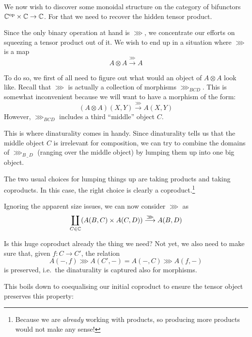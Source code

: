 We now wish to discover some monoidal structure on the category of bifunctors
\\${\mathbb{C}}^{\text{op}} \times \mathbb{C} \to \mathbb{C}$. For that we need to recover the hidden
tensor product.

Since the only binary operation at hand is $\ggg$, we concentrate our efforts
on squeezing a tensor product out of it. We wish to end up in a situation where
$\ggg$ is a map \[ A \otimes A \overset{\ggg}{\longrightarrow} A \]

To do so, we first of all need to figure out what would an object of $A \otimes
A$ look like. Recall that $\ggg$ is actually a collection of morphisms
$\ggg_{BCD}$. This is somewhat inconvenient because we will want to have a
morphism of the form: \[ (A \otimes A)(X, Y) \overset{\ggg}{\longrightarrow}
A(X, Y) \] However, $\ggg_{BCD}$ includes a third ``middle'' object $C$.

This is where dinaturality comes in handy. Since dinaturality tells us that the
middle object $C$ is irrelevant for composition, we can try to combine the domains of
$\ggg_{B\,\_ \,D}$ (ranging over the middle object) by lumping them up into one big
object.

The two usual choices for lumping things up are taking products and taking
coproducts. In this case, the right choice is clearly a
coproduct.\footnote{Because we are \emph{already} working with products, so
producing more products would not make any sense!}

Ignoring the apparent size issues, we can now consider $\ggg$ as
\begin{align}\label{ggg-coprod}
\coprod_{C \in \mathbb{C}} (A(B, C) \times A(C, D))
    \overset{\ggg}{\longrightarrow} A(B, D)
\end{align}

Is this huge coproduct already the thing we need? Not yet, we also need to make
sure that, given $f: C \to C'$, the relation
\begin{equation}\label{eq:rel}
    A(-, f) \ggg A(C', -) = A(-, C) \ggg A(f, -)
\end{equation}
is preserved, i.e.~the dinaturality is captured also for morphisms.

This boils down to coequalising our initial coproduct to ensure the tensor
object preserves this property:

